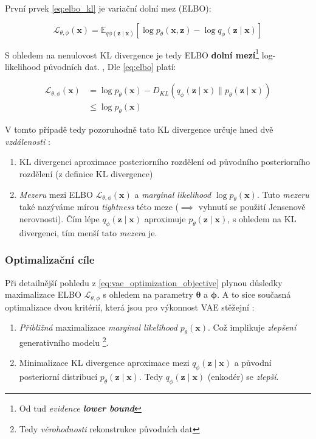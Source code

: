 První prvek \autoref{eq:elbo_kl} je variační dolní mez (ELBO):

\begin{equation} \label{eq:elbo}
    \mathcal{L}_{\theta,\phi}(\textbf{x}) = \mathds{E}_{q\phi(\textbf{z}\mid\textbf{x})}[\log p_\theta(\textbf{x},\textbf{z}) - \log q_\phi(\textbf{z}\mid\textbf{x})]
\end{equation}

S ohledem na nenulovost KL divergence je tedy ELBO \textbf{dolní mezí}\footnote{Od tud \emph{evidence \textbf{lower bound}}} log-likelihood původních dat. \cite{Kingma2014}, \cite{Goodfellow2016}
Dle \autoref{eq:elbo} platí:

\begin{align}
    \mathcal{L}_{\theta,\phi}(\textbf{x}) &= \log p_\theta(\textbf{x}) - D_{KL}(q_\phi(\textbf{z}\mid\textbf{x})\parallel p_\theta(\textbf{z}\mid\textbf{x})) \\ \label{eq:vae_optimization_objective}
                                          &\leq \log p_\theta(\textbf{x})
\end{align}

V tomto případě tedy pozoruhodně tato KL divergence určuje hned dvě \emph{vzdálenosti} \cite{Kingma2019}:
\begin{enumerate}
    \item KL divergenci aproximace posteriorního rozdělení od původního posteriorního rozdělení (z definice KL divergence)
    \item \emph{Mezeru} mezi ELBO $\mathcal{L}_{\theta,\phi}(\textbf{x})$ a \emph{marginal likelihood} $\log p_\theta(\textbf{x})$. Tuto \emph{mezeru} také nazýváme mírou \emph{tightness} této meze ($\implies$ vyhnutí se použití Jensenově nerovnosti). Čím lépe $q_\phi(\textbf{z}\mid\textbf{x})$ aproximuje $p_\theta(\textbf{z}\mid\textbf{x})$, s ohledem na KL divergenci, tím menší tato \emph{mezera} je.
\end{enumerate}

\subsubsection{Optimalizační cíle}
Při detailnější pohledu z \autoref{eq:vae_optimization_objective} plynou důsledky maximalizace ELBO $\mathcal{L_{\theta,\phi}}$ s ohledem na parametry $\boldsymbol{\theta}$ a $\boldsymbol{\phi}$.
A to sice současná optimalizace dvou kritérií, která jsou pro výkonnost VAE stěžejní \cite{Kingma2019}:

\begin{enumerate}
    \item \emph{Přibližná} maximalizace \emph{marginal likelihood} $p_\theta(\textbf{x})$. Což implikuje \emph{zlepšení} generativního modelu \footnote{Tedy \emph{věrohodnosti} rekonstrukce původních dat}.
    \item Minimalizace KL divergence aproximace mezi $q_\phi(\textbf{z}\mid\textbf{x})$ a původní posteriorní distribucí $p_\theta(\textbf{z}\mid\textbf{x})$. Tedy $q_\phi(\textbf{z}\mid\textbf{x})$ (enkodér) se \emph{zlepší}.
\end{enumerate}

